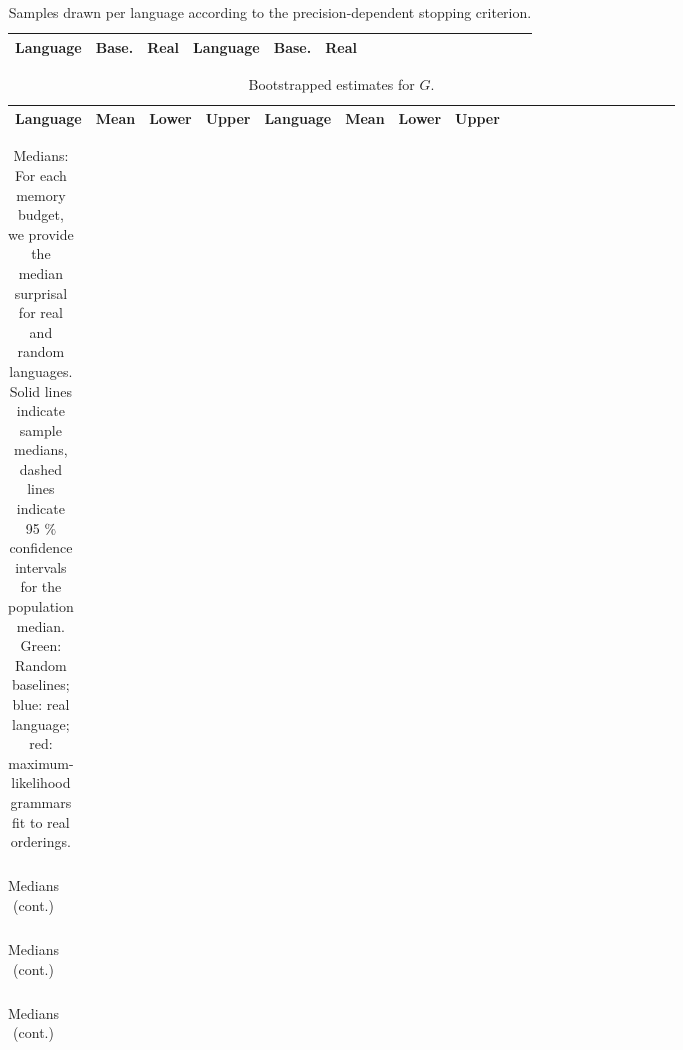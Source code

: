 \documentclass[11pt,letterpaper]{article}
\begin{document}
\begin{table}
\begin{longtable}{l|ll||l|llllllllllllll}
	Language & Base. & Real & Language & Base. & Real \\ \hline

\end{longtable}
	\caption{Samples drawn per language according to the precision-dependent stopping criterion.}\label{tab:samples}
\end{table}



\begin{table}
\begin{longtable}{l|lll||l|lllllllllllllll}
	Language & Mean & Lower & Upper & Language & Mean & Lower & Upper \\ \hline

\end{longtable}
	\caption{Bootstrapped estimates for $G$.}\label{tab:boot-g}
\end{table}



\begin{table}
\begin{longtable}{ccccccccccccccclll}

\end{longtable}
	\caption{Medians: For each memory budget, we provide the median surprisal for real and random languages. Solid lines indicate sample medians, dashed lines indicate 95 $\%$ confidence intervals for the population median. Green: Random baselines; blue: real language; red: maximum-likelihood grammars fit to real orderings.}\label{tab:medians}
\end{table}

\begin{table}
\begin{longtable}{ccccccccccccccclll}

\end{longtable}
	\caption{Medians (cont.)}
\end{table}

\begin{table}
\begin{longtable}{ccccccccccccccclll}

\end{longtable}
	\caption{Medians (cont.)}
\end{table}

\begin{table}
\begin{longtable}{ccccccccccccccclll}

\end{longtable}
	\caption{Medians (cont.)}
\end{table}
\end{document}
